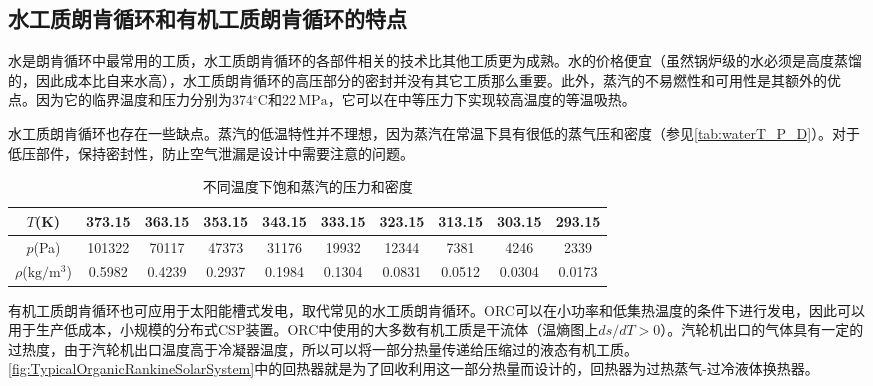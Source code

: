 \subsection{水工质朗肯循环和有机工质朗肯循环的特点}
\label{sec:RankineCycleFluid}

水是朗肯循环中最常用的工质，水工质朗肯循环的各部件相关的技术比其他工质更为成熟。水的价格便宜（虽然锅炉级的水必须是高度蒸馏的，因此成本比自来水高），水工质朗肯循环的高压部分的密封并没有其它工质那么重要。此外，蒸汽的不易燃性和可用性是其额外的优点。因为它的临界温度和压力分别为374$\mathrm{^\circ C}$和22$\,\mathrm{MPa}$，它可以在中等压力下实现较高温度的等温吸热。

水工质朗肯循环也存在一些缺点。蒸汽的低温特性并不理想，因为蒸汽在常温下具有很低的蒸气压和密度（参见\autoref{tab:waterT_P_D}）。对于低压部件，保持密封性，防止空气泄漏是设计中需要注意的问题。
\begin{table}[htbp]
	\caption{不同温度下饱和蒸汽的压力和密度}
	\centering
	\begin{tabular}{cccccccccc}
		\toprule	
		    $T$(K)    &	373.15	    &    363.15    &    353.15    &    343.15    &    333.15    &    323.15    &    313.15    &    303.15    &    293.15\\
		\midrule	
		    $p$(Pa)    &    101322        &    70117    &    47373    &    31176    &    19932    &    12344    &    7381    &    4246    &    2339\\
		    $\rho$($\mathrm{kg/m^3}$)    &    0.5982        &    0.4239    &    0.2937    &    0.1984    &    0.1304    &    0.0831    &    0.0512    &    0.0304    &    0.0173\\
		\bottomrule
	\end{tabular}
	\label{tab:waterT_P_D}
\end{table}

有机工质朗肯循环也可应用于太阳能槽式发电，取代常见的水工质朗肯循环。ORC可以在小功率和低集热温度的条件下进行发电，因此可以用于生产低成本，小规模的分布式CSP装置。ORC中使用的大多数有机工质是干流体（温熵图上$ds/dT > 0$）。汽轮机出口的气体具有一定的过热度，由于汽轮机出口温度高于冷凝器温度，所以可以将一部分热量传递给压缩过的液态有机工质。\autoref{fig:TypicalOrganicRankineSolarSystem}中的回热器就是为了回收利用这一部分热量而设计的，回热器为过热蒸气-过冷液体换热器。

